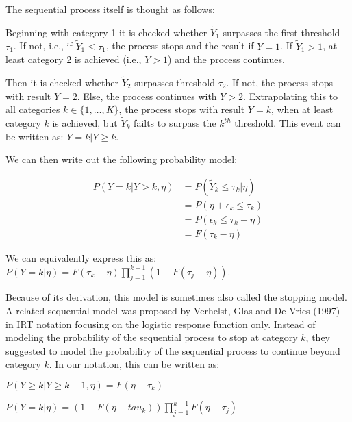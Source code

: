 The sequential process itself is thought as follows:

Beginning with category 1 it is checked whether $\tilde Y_{1}$ surpasses the first threshold $\tau_{1}$. If not, i.e., if $\tilde Y_{1} \leq \tau_{1}$, the process stops and the result if $Y=1$. If $\tilde Y_{1} > 1$, at least category 2 is achieved (i.e., $Y>1$) and the process continues.

Then it is checked whether $\tilde Y_{2}$ surpasses threshold $\tau_{2}$. If not, the process stops with result $Y=2$. Else, the process continues with $Y>2$. Extrapolating this to all categories $k \in \{1, \ldots, K \}$, the process stops with result $Y=k$, when at least category $k$ is achieved, but $\tilde Y_{k}$ failts to surpass the $k^{th}$ threshold. This event can be written as: $Y = k|Y \geq k$.

We can then write out the following probability model:

\begin{align*}
P(Y = k | Y>k, \eta) &= P(\tilde Y_{k} \leq \tau_{k} | \eta) \\
&= P(\eta + \epsilon_{k} \leq \tau_{k}) \\
&= P(\epsilon_{k} \leq \tau_{k} - \eta) \\
&= F(\tau_{k} - \eta)
\end{align*}

We can equivalently express this as: $P(Y = k | \eta) = F(\tau_{k} - \eta) \prod_{j=1}^{k-1} (1-F(\tau_{j} - \eta))$.

Because of its derivation, this model is sometimes also called the stopping model. A related sequential model was proposed by Verhelst, Glas and De Vries (1997) in IRT notation focusing on the logistic response function only. Instead of modeling the probability of the sequential process to stop at category $k$, they suggested to model the probability of the sequential process to continue beyond category $k$. In our notation, this can be written as:

$P(Y \geq k | Y \geq k-1, \eta) = F(\eta - \tau_{k})$

$P(Y=k | \eta) = (1-F(\eta-tau_{k})) \prod_{j=1}^{k-1} F(\eta-\tau_{j})$
